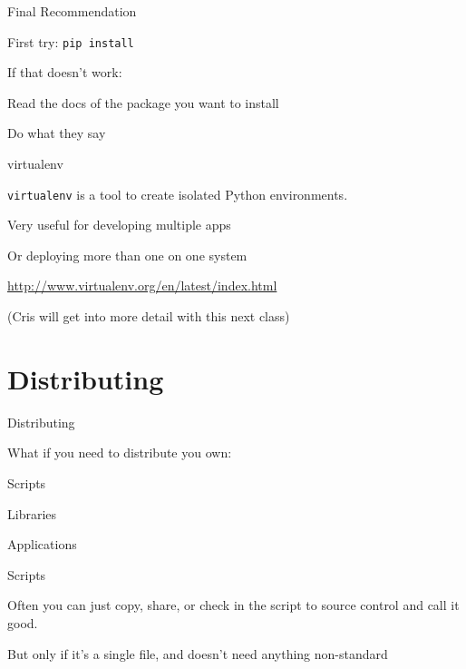 \documentclass{beamer}
\begin{document}
\begin{frame}[fragile]{Final Recommendation}

{\Large First try: \verb|pip install|}

\vfill
{\Large If that doesn't work:}

\vfill
{\Large Read the docs of the package you want to install}

\vfill
{\Large Do what they say}

\end{frame} 

\begin{frame}[fragile]{virtualenv}

{\Large \verb|virtualenv| is a tool to create isolated Python environments.}

\vfill
{\Large Very useful for developing multiple apps}

\vfill
{\Large Or deploying more than one on one system}

\vfill
\url{http://www.virtualenv.org/en/latest/index.html}

\vfill
(Cris will get into more detail with this next class)

\end{frame} 


\section{Distributing}

\begin{frame}[fragile]{Distributing}

{\LARGE What if you need to distribute you own:}

\vfill
{\Large Scripts}

\vfill
{\Large Libraries }

\vfill
{\Large Applications }
\vfill

\end{frame} 

\begin{frame}[fragile]{Scripts}

\vfill
{\LARGE Often you can just copy, share, or check in the script to source
control and call it good.}

\vfill
{\Large But only if it's a single file, and doesn't need anything non-standard}

\end{frame} 
\end{document}
